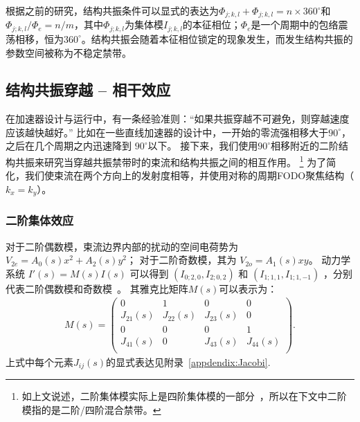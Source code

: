 根据之前的研究\cite{11,12}，结构共振条件可以显式的表达为$\Phi_{j;k,l}+\Phi_{j;k,l}=n\times 360^{\circ}$和$\Phi_{j;k,l}/\Phi_{e}=n/m$，其中$\Phi_{j;k,l}$为集体模$I_{j;k,l}$的本征相位；$\Phi_{e}$是一个周期中的包络震荡相移，恒为$360^{\circ}$。结构共振会随着本征相位锁定的现象发生，而发生结构共振的参数空间被称为不稳定禁带。

\subsection{结构共振穿越 -- 相干效应}
\label{section:Crossing_Coherent}
在加速器设计与运行中，有一条经验准则：“如果共振穿越不可避免，则穿越速度应该越快越好。”
比如在一些直线加速器的设计中，一开始的零流强相移大于$90^{\circ}$，之后在几个周期之内迅速降到 $90^{\circ}$以下。
接下来，我们使用$90^{\circ}$相移附近的二阶结构共振来研究当穿越共振禁带时的束流和结构共振之间的相互作用。
\footnote{如上文说述，二阶集体模实际上是四阶集体模的一部分~\cite{12}，所以在下文中二阶模指的是二阶/四阶混合禁带。}
为了简化，我们使束流在两个方向上的发射度相等，并使用对称的周期FODO聚焦结构（$k_x=k_y$）。

\subsubsection{二阶集体效应}
对于二阶偶数模，束流边界内部的扰动的空间电荷势为 $V_{2e}=A_0(s)x^2+A_2(s)y^2$；
对于二阶奇数模，其为 $V_{2o}=A_1(s)xy$。
动力学系统 $I'(s)=M(s)I(s)$ 可以得到 $(I_{0;2,0}, I_{2;0,2})$ 和  $(I_{1;1,1}, I_{1;1,-1})$ ，分别代表二阶偶数模和奇数模~\cite{11, 12, 18}。
其雅克比矩阵$M(s)$可以表示为：
\begin{eqnarray}\label{eq2.5}
M(s)=
\left(
  \begin{array}{cccc}
    0         & 1         & 0         & 0         \\
    J_{21}(s) & J_{22}(s) & J_{23}(s) & 0         \\
    0         & 0         & 0         & 1         \\
    J_{41}(s) & 0         & J_{43}(s) & J_{44}(s) \\
  \end{array}
\right).
\end{eqnarray}
上式中每个元素$J_{ij}(s)$的显式表达见附录~\ref{appdendix:Jacobi}.

